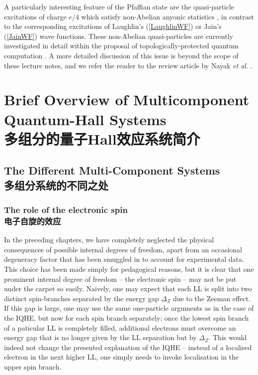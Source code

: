 \documentclass[10pt]{book}
\begin{document}
A particularly interesting
feature of the Pfaffian state are the quasi-particle excitations of charge $e/4$ which satisfy non-Abelian anyonic
statistics \cite{MR}, in contrast to the corresponding excitations of Laughlin's (\ref{LaughlinWF}) or Jain's 
(\ref{JainWF}) wave functions. These non-Abelian quasi-particles are currently investigated in detail within the proposal
of topologically-protected quantum computation \cite{kitaev}. A more detailed discussion of this issue is beyond
the scope of these lecture notes, and we refer the reader to the review article by Nayak {\sl et al.} \cite{nayak}.




\chapter[多组分的量子Hall系统简介]{Brief Overview of Multicomponent Quantum-Hall Systems\\\bf 多组分的量子Hall效应系统简介}
\label{MultiC}

\section[多组分系统的不同之处]{The Different Multi-Component Systems\\\bf 多组分系统的不同之处}




\subsection[电子自旋的效应]{The role of the electronic spin\\\bf 电子自旋的效应}

In the preceding chapters, we have completely neglected the physical consequences of possible internal degrees of
freedom, apart from an occasional degeneracy factor that has been smuggled in to account for experimental data.
This choice has been made simply for pedagogical reasons, but it is clear that one prominent internal degree of freedom --
the electronic spin -- may not be put under the carpet so easily. Naively, one may expect that each LL
is split into two distinct spin-branches separated by the energy gap $\Delta_Z$ due to the Zeeman effect. If this gap 
is large, one may use the same one-particle arguments as in the case of the IQHE, but now for each spin branch separately:
once the lowest spin branch of a paticular LL is completely filled, additional electrons must overcome an energy
gap that is no longer given by the LL separation but by $\Delta_Z$. This would indeed not change the presented 
explanation of the IQHE -- instead of a localised electron in the next higher LL, one simply needs to invoke localisation
in the upper spin branch. 
\end{document}
